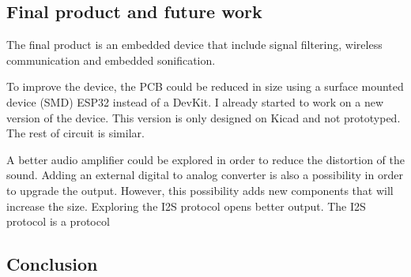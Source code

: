 \subsection{Final product and future work}

The final product is an embedded device that include signal filtering, wireless communication and embedded sonification.


To improve the device, the PCB could be reduced in size using a surface mounted device (SMD) ESP32 instead of a DevKit.
I already started to work on a new version of the device. This version is only designed on Kicad and not prototyped.
The rest of circuit is similar. 



A better audio amplifier could be explored in order to reduce the distortion of the sound.
Adding an external digital to analog converter is also a possibility in order to upgrade the output. However,
this possibility adds new components that will increase the size. Exploring the I2S protocol opens better output.
The I2S protocol is a protocol  %


\subsection{Conclusion}